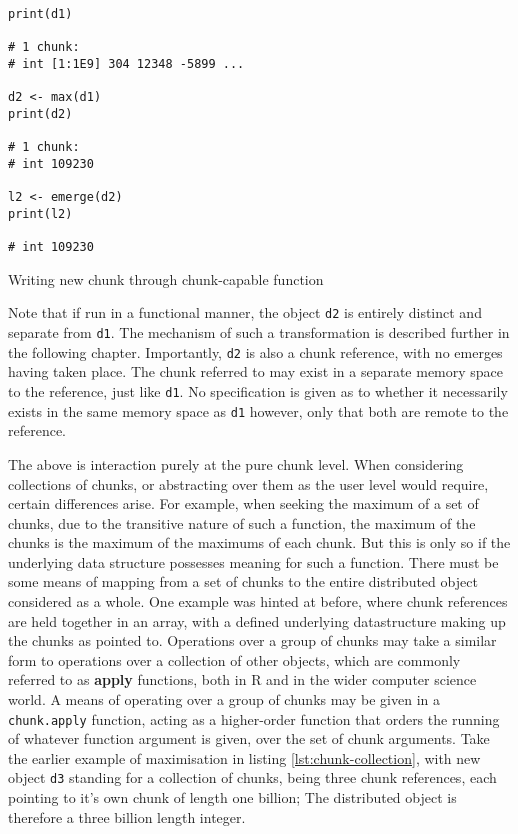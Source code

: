 \begin{listing}
    \begin{verbatim}
print(d1)

# 1 chunk:
# int [1:1E9] 304 12348 -5899 ...

d2 <- max(d1)
print(d2)

# 1 chunk:
# int 109230

l2 <- emerge(d2)
print(l2)

# int 109230
    \end{verbatim}
    \caption{Writing new chunk through chunk-capable function}
    \label{lst:write-chunk}
\end{listing}

Note that if run in a functional manner, the object \texttt{d2} is
entirely distinct and separate from \texttt{d1}. The mechanism of such a
transformation is described further in the following chapter.
Importantly, \texttt{d2} is also a chunk reference, with no emerges
having taken place. The chunk referred to may exist in a separate memory
space to the reference, just like \texttt{d1}. No specification is given
as to whether it necessarily exists in the same memory space as
\texttt{d1} however, only that both are remote to the reference.

The above is interaction purely at the pure chunk level. When
considering collections of chunks, or abstracting over them as the user
level would require, certain differences arise. For example, when
seeking the maximum of a set of chunks, due to the transitive nature of
such a function, the maximum of the chunks is the maximum of the
maximums of each chunk. But this is only so if the underlying data
structure possesses meaning for such a function. There must be some
means of mapping from a set of chunks to the entire distributed object
considered as a whole. One example was hinted at before, where chunk
references are held together in an array, with a defined underlying
datastructure making up the chunks as pointed to. Operations over a
group of chunks may take a similar form to operations over a collection
of other objects, which are commonly referred to as \textbf{apply}
functions, both in R and in the wider computer science world. A means of
operating over a group of chunks may be given in a \texttt{chunk.apply}
function, acting as a higher-order function that orders the running of
whatever function argument is given, over the set of chunk arguments.
Take the earlier example of maximisation in listing \cref{lst:chunk-collection}, with new object \texttt{d3}
standing for a collection of chunks, being three chunk references, each
pointing to it's own chunk of length one billion; The distributed object
is therefore a three billion length integer.

